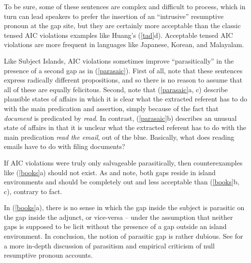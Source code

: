 \documentclass[output=paper
	        ,collection
	        ,collectionchapter
 	        ,biblatex
                ,babelshorthands
                ,newtxmath
                ,draftmode
                ,colorlinks, citecolor=brown
]{langscibook}
\begin{document}
\noindent 
To be sure, some of these  sentences are complex and difficult to process,  
which in turn can lead speakers to prefer the insertion of an ``intrusive'' resumptive 
pronoun at the gap site, but they are certainly more acceptable than the 
classic tensed AIC violations examples like Huang's (\ref{tad}d).
Acceptable tensed AIC violations are more frequent in languages like Japanese, Korean,  and Malayalam.

Like Subject Islands, AIC violations sometimes improve ``parasitically'' in the presence of a second gap as in (\ref{parasaic}). First of all, note that these sentences express radically different propositions, and so there is no reason to assume that all of these are equally felicitous.
Second, note that (\ref{parasaic}a, c) describe plausible  states of affairs in which it is clear what the extracted referent has to do with the main predication and assertion, simply because of the fact that \emph{document}  is predicated by \emph{read}.  In contrast, (\ref{parasaic}b) describes an unusual state of affairs in that  it is unclear what the extracted referent  has to do with the main predication \emph{read the email}, out of the blue. Basically, what does reading emails have to do with filing documents?

\eal \label{parasaic}
\zl

\noindent
If AIC violations were truly only salvageable parasitically, then counterexamples
like (\ref{books}a) should not exist.  As 
\citet{Levine:Sag:03} and
\citet[256]{levhubook}
note, both gaps reside in island environments and should be 
completely out and less acceptable than (\ref{books}b, c), contrary to fact.

\eal  \label{books}
\zl

\noindent
In (\ref{books}a), there is no sense in which the gap inside the subject is parasitic on the gap inside the  adjunct, or vice-versa -- under the assumption that neither gaps is supposed to be licit without  the presence of a gap outside an island environment. In conclusion, the notion of parasitic 
gap is rather dubious. See \citet{levhubook} for a more in-depth discussion of parasitism and 
empirical criticism of null resumptive pronoun accounts.
\end{document}
